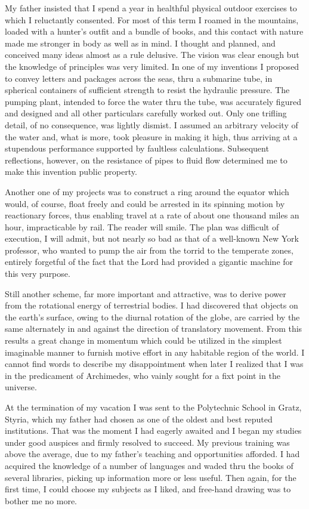 \documentclass[a4paper,12pt,english,twoside,openright]{memoir}
\begin{document}
My father insisted that I spend a year in healthful physical outdoor exercises to which I reluctantly 
consented.  For most of this term I roamed in the mountains, loaded with a hunter's outfit and a bundle of books, and this contact with nature made me stronger in body as well as in mind.  I 
thought and planned, and conceived many ideas almost as a rule delusive.  The vision was clear 
enough but the knowledge of principles was very limited.  In one of my inventions I proposed to 
convey letters and packages across the seas, thru a submarine tube, in spherical containers of 
sufficient strength to resist the hydraulic pressure.  The pumping plant, intended to force the 
water thru the tube, was accurately figured and designed and all other particulars carefully 
worked out.  Only one trifling detail, of no consequence, was lightly dismist.  I assumed an 
arbitrary velocity of the water and, what is more, took pleasure in making it high, thus arriving at a 
stupendous performance supported by faultless calculations.  Subsequent reflections, however, 
on the resistance of pipes to fluid flow determined me to make this invention public property.  

Another one of my projects was to construct a ring around the equator which would, of course, 
float freely and could be arrested in its spinning motion by reactionary forces, thus enabling travel 
at a rate of about one thousand miles an hour, impracticable by rail.  The reader will smile.  The 
plan was difficult of execution, I will admit, but not nearly so bad as that of a well-known New York 
professor, who wanted to pump the air from the torrid to the temperate zones, entirely forgetful of 
the fact that the Lord had provided a gigantic machine for this very purpose.  

Still another scheme, far more important and attractive, was to derive power from the rotational 
energy of terrestrial bodies.  I had discovered that objects on the earth's surface, owing to the 
diurnal rotation of the globe, are carried by the same alternately in and against the direction of 
translatory movement.  From this results a great change in momentum which could be utilized in 
the simplest imaginable manner to furnish motive effort in any habitable region of the world.  I 
cannot find words to describe my disappointment when later I realized that I was in the 
predicament of Archi\-medes, who vainly sought for a fixt point in the universe.


At the termination of my vacation I was sent to the Polytechnic School in Gratz, Styria, which my 
father had chosen as one of the oldest and best reputed institutions.  That was the moment I had 
eagerly awaited and I began my studies under good auspices and firmly resolved to succeed.  My 
previous training was above the average, due to my father's teaching and opportunities afforded.  
I had acquired the knowledge of a number of languages and waded thru the books of several 
libraries, picking up information more or less useful.  Then again, for the first time, I could choose 
my subjects as I liked, and free-hand drawing was to bother me no more.  
\end{document}
